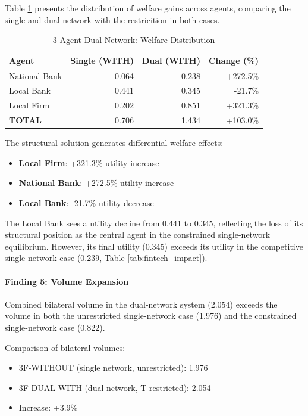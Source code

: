 Table \ref{tab:3f_dual_welfare_decomp} presents the distribution of welfare gains across agents, comparing the single and dual network with the restricition in both cases.

\begin{table}[h]
\centering
\caption{3-Agent Dual Network: Welfare Distribution}
\label{tab:3f_dual_welfare_decomp}
\begin{tabular}{lrrr}
\hline
\textbf{Agent} & \textbf{Single (WITH)} & \textbf{Dual (WITH)} & \textbf{Change (\%)} \\ \hline
National Bank & 0.064 & 0.238 & +272.5\% \\
Local Bank & 0.441 & 0.345 & -21.7\% \\
Local Firm & 0.202 & 0.851 & +321.3\% \\
\hline
\textbf{TOTAL} & 0.706 & 1.434 & +103.0\% \\
\hline
\end{tabular}
\end{table}

The structural solution generates differential welfare effects:
\begin{itemize}
    \item \textbf{Local Firm}: +321.3\% utility increase
    \item \textbf{National Bank}: +272.5\% utility increase
    \item \textbf{Local Bank}: -21.7\% utility decrease
\end{itemize}

The Local Bank sees a utility decline from 0.441 to 0.345, reflecting the loss of its structural position as the central agent in the constrained single-network equilibrium. However, its final utility (0.345) exceeds its utility in the competitive single-network case (0.239, Table \ref{tab:fintech_impact}).

\paragraph{Finding 5: Volume Expansion}

Combined bilateral volume in the dual-network system (2.054) exceeds the volume in both the unrestricted single-network case (1.976) and the constrained single-network case (0.822).

Comparison of bilateral volumes:
\begin{itemize}
    \item 3F-WITHOUT (single network, unrestricted): 1.976
    \item 3F-DUAL-WITH (dual network, T restricted): 2.054
    \item Increase: +3.9\%
\end{itemize}

